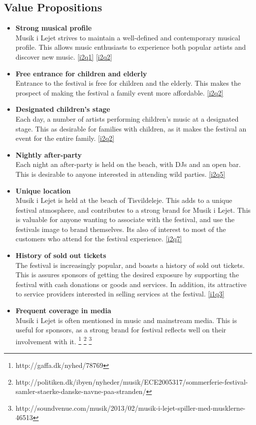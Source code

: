 \subsection{Value Propositions} %
\label{sub:value_propositions}
\begin{itemize}
	\item \textbf{Strong musical profile}\\
	 Musik i Lejet strives to maintain a well-defined and contemporary musical profile. This allows music enthusiasts to experience both popular artists and discover new music. \ref{i2q1} \ref{i2q2}
	\item \textbf{Free entrance for children and elderly}\\
	Entrance to the festival is free for children and the elderly. This makes the prospect of making the festival a family event more affordable. \ref{i2q2}
	\item \textbf{Designated children's stage}\\
	Each day, a number of artists performing children's music at a designated stage. This as desirable for families with children, as it makes the festival an event for the entire family. \ref{i2q2}
	\item \textbf{Nightly after-party}\\
	Each night an after-party is held on the beach, with DJs and an open bar. This is desirable to anyone interested in attending wild parties. \ref{i2q5}
	\item \textbf{Unique location}\\
	Musik i Lejet is held at the beach of Tisvildeleje. This adds to a unique festival atmosphere, and contributes to a strong brand for Musik i Lejet. This is valuable for anyone wanting to associate with the festival, and use the festivals image to brand themselves. Its also of interest to most of the customers who attend for the festival experience. \ref{i2q7}
	\item \textbf{History of sold out tickets}\\
	The festival is increasingly popular, and boasts a history of sold out tickets. This is assures sponsors of getting the desired exposure by supporting the festival with cash donations or goods and services. In addition, its attractive to service providers interested in selling services at the festival. \ref{i1q3}
	\item \textbf{Frequent coverage in media}\\
	Musik i Lejet is often mentioned in music and mainstream media. This is useful for sponsors, as a strong brand for festival reflects well on their involvement with it. \footnote{http://gaffa.dk/nyhed/78769} \footnote{http://politiken.dk/ibyen/nyheder/musik/ECE2005317/sommerferie-festival-samler-staerke-danske-navne-paa-stranden/}
	\footnote{http://soundvenue.com/musik/2013/02/musik-i-lejet-spiller-med-musklerne-46513}
\end{itemize}

